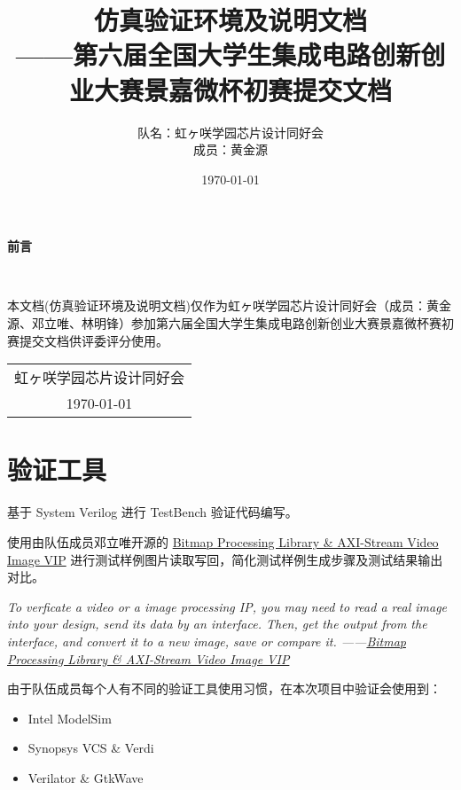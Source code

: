\documentclass[12pt, a4paper, oneside]{ctexbook}
\title{{\Huge{\textbf{仿真验证环境及说明文档}}}\normalsize{\\——第六届全国大学生集成电路创新创业大赛景嘉微杯初赛提交文档}}
\author{队名：虹ヶ咲学园芯片设计同好会\\ 成员：黄金源\space邓立唯\space林明锋}
\date{\today}
\begin{document}
	\maketitle	
	\setcounter{page}{1}
	\begin{center}
		\Huge\textbf{前言}
	\end{center}~\
	
	本文档(仿真验证环境及说明文档)仅作为虹ヶ咲学园芯片设计同好会（成员：黄金源、邓立唯、林明锋）参加第六届全国大学生集成电路创新创业大赛景嘉微杯赛初赛提交文档供评委评分使用。
	~\\
	\begin{flushright}
		\begin{tabular}{c}
			虹ヶ咲学园芯片设计同好会\\
			\today
		\end{tabular}
	\end{flushright}
	\newpage
	\setcounter{page}{1}
	\tableofcontents
	\newpage
	\setcounter{page}{1}
	
	\chapter{验证工具}
	基于 System Verilog 进行 TestBench 验证代码编写。\par 使用由队伍成员邓立唯开源的 \href{https://github.com/Aperture-Electronic/SystemVerilog-Bitmap-Library-AXI-Image-VIP}{Bitmap Processing Library \& AXI-Stream Video Image VIP} 进行测试样例图片读取写回，简化测试样例生成步骤及测试结果输出对比。\par \par
	\emph{To verficate a video or a image processing IP, you may need to read a real image into your design, send its data by an interface. Then, get the output from the interface, and convert it to a new image, save or compare it. ——\href{https://github.com/Aperture-Electronic/SystemVerilog-Bitmap-Library-AXI-Image-VIP}{Bitmap Processing Library \& AXI-Stream Video Image VIP}}
	\par \par 由于队伍成员每个人有不同的验证工具使用习惯，在本次项目中验证会使用到：
	\begin{itemize}
		\item Intel ModelSim
		\item Synopsys VCS \& Verdi
		\item Verilator \& GtkWave
	\end{itemize}
\end{document}
